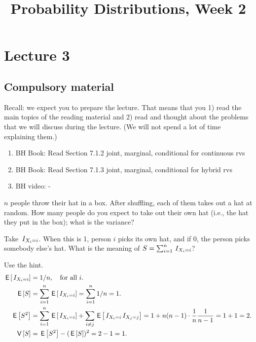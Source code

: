 


\title{Probability Distributions, Week 2}


\maketitle
\toccontents


\section{Lecture 3}
\label{sec:lecture-1}

\subsection{Compulsory material}

Recall: we expect you to prepare the lecture.
That means that you 1) read the main topics of the reading material and 2) read and thought about the problems that we will discuss during the lecture.
(We will not spend a lot of time explaining them.)

\begin{enumerate}
\item BH Book: Read Section 7.1.2 joint, marginal, conditional for continuous rvs
\item BH Book: Read Section 7.1.3 joint, marginal, conditional for hybrid rvs
\item BH video: -
\end{enumerate}

\begin{exercise}
$n$ people throw their hat in a box.
After shuffling, each of them takes out a hat at random.
How many people do you expect to take out their own hat (i.e., the hat they put in the box); what is the variance?
\begin{hint}
Take $\,I_{X_i=i}$. When this is 1, person $i$ picks its own hat, and if 0, the person picks somebody else's hat. What is the meaning of $S=\sum_{i=1}^n \,I_{X_i=i}$?
\end{hint}
\begin{solution}
Use the hint.
\begin{align*}
\,\mathsf{E}\left[\,I_{X_i=i}\right] &= 1/n, \quad \text{for all } i. \\
  \,\mathsf{E}\left[S\right] &= \sum_{i=1}^n \,\mathsf{E}\left[\,I_{X_{i}=i}\right] = \sum_{i=1}^n 1/n = 1. \\
  \,\mathsf{E}\left[S^{2}\right] &= \sum_{i=1}^n \,\mathsf{E}\left[\,I_{X_{i}=i}\right] + \sum_{i \neq j} \,\mathsf{E}\left[\,I_{X_{i}=i}\,I_{X_{j}=j}\right] = 1 + n(n-1)\cdot \frac{1}{n}\frac{1}{n-1} = 1 + 1 =2.\\
  \,\mathsf{V}\left[S\right] &= \,\mathsf{E}\left[S^{2}\right]  - (\,\mathsf{E}\left[S\right])^{2} = 2 - 1 = 1.
\end{align*}
\end{solution}
\end{exercise}



